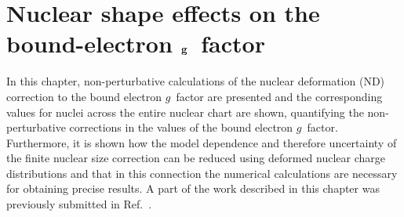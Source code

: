 \chapter{Nuclear shape effects on the bound-electron $\bf{g}$~factor}
\label{ch:nucl_def}

In this chapter, non-perturbative calculations of the nuclear deformation (ND) correction to the bound electron $g$~factor are presented and the corresponding values for nuclei across the entire nuclear chart are shown, quantifying the non-perturbative corrections in the values of the bound electron $g$~factor. Furthermore, it is shown how the model dependence and therefore uncertainty of the finite nuclear size correction can be reduced using deformed nuclear charge distributions and that in this connection the numerical calculations are necessary for obtaining precise results. A part of the work described in this chapter was previously submitted in Ref.~\cite{michel_nuclDef}.

